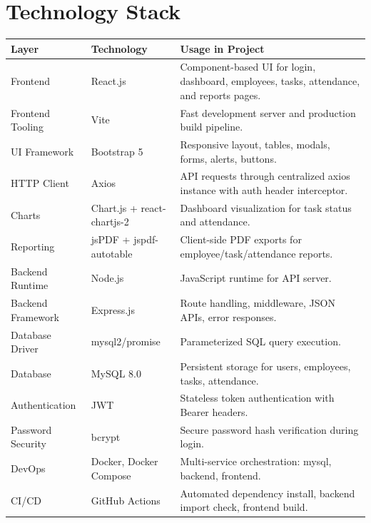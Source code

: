 ﻿\chapter{Technology Stack}

\begin{longtable}{p{3.2cm}p{3.2cm}p{8.0cm}}
\toprule
\textbf{Layer} & \textbf{Technology} & \textbf{Usage in Project} \\
\midrule
\endhead
Frontend & React.js & Component-based UI for login, dashboard, employees, tasks, attendance, and reports pages. \\
Frontend Tooling & Vite & Fast development server and production build pipeline. \\
UI Framework & Bootstrap 5 & Responsive layout, tables, modals, forms, alerts, buttons. \\
HTTP Client & Axios & API requests through centralized axios instance with auth header interceptor. \\
Charts & Chart.js + react-chartjs-2 & Dashboard visualization for task status and attendance. \\
Reporting & jsPDF + jspdf-autotable & Client-side PDF exports for employee/task/attendance reports. \\
Backend Runtime & Node.js & JavaScript runtime for API server. \\
Backend Framework & Express.js & Route handling, middleware, JSON APIs, error responses. \\
Database Driver & mysql2/promise & Parameterized SQL query execution. \\
Database & MySQL 8.0 & Persistent storage for users, employees, tasks, attendance. \\
Authentication & JWT & Stateless token authentication with Bearer headers. \\
Password Security & bcrypt & Secure password hash verification during login. \\
DevOps & Docker, Docker Compose & Multi-service orchestration: mysql, backend, frontend. \\
CI/CD & GitHub Actions & Automated dependency install, backend import check, frontend build. \\
\bottomrule
\end{longtable}
